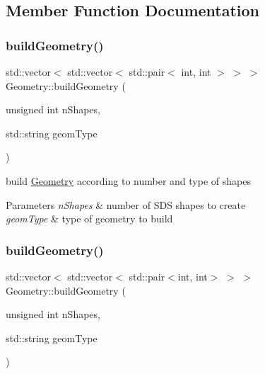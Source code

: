 \subsection{Member Function Documentation}
\mbox{\label{classGeometry_a64fa42fab5fe0c5e9bb7d960bafa55fd}} 
\subsubsection{\texorpdfstring{build\+Geometry()}{buildGeometry()}\hspace{0.1cm}{\footnotesize\ttfamily [1/2]}}
{\footnotesize\ttfamily std\+::vector$<$ std\+::vector$<$ std\+::pair$<$ int, int $>$ $>$ $>$ Geometry\+::build\+Geometry (\begin{DoxyParamCaption}\item[{unsigned int}]{n\+Shapes,  }\item[{std\+::string}]{geom\+Type }\end{DoxyParamCaption})}

build \hyperlink{classGeometry}{Geometry} according to number and type of shapes


\begin{DoxyParams}{Parameters}
{\em n\+Shapes} & number of S\+DS shapes to create \\
\hline
{\em geom\+Type} & type of geometry to build \\
\hline
\end{DoxyParams}
\mbox{\label{classGeometry_aad1f3c4e6930c4dc26d82b000cecd5eb}} 
\subsubsection{\texorpdfstring{build\+Geometry()}{buildGeometry()}\hspace{0.1cm}{\footnotesize\ttfamily [2/2]}}
{\footnotesize\ttfamily std\+::vector$<$ std\+::vector$<$ std\+::pair$<$int, int$>$ $>$ $>$ Geometry\+::build\+Geometry (\begin{DoxyParamCaption}\item[{unsigned int}]{n\+Shapes,  }\item[{std\+::string}]{geom\+Type }\end{DoxyParamCaption})}

